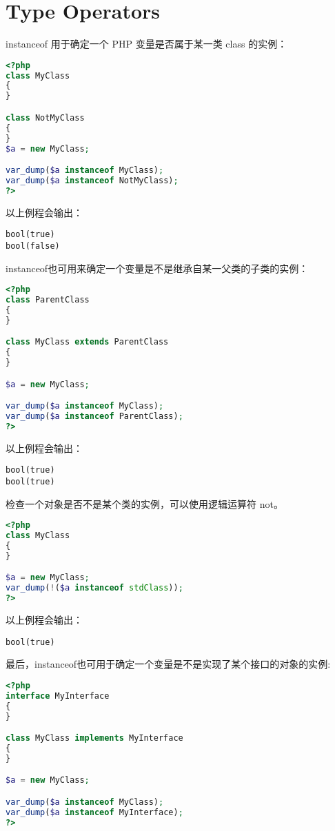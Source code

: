 \section{Type Operators}


instanceof 用于确定一个 PHP 变量是否属于某一类 class 的实例：

\begin{lstlisting}[language=PHP]
<?php
class MyClass
{
}

class NotMyClass
{
}
$a = new MyClass;

var_dump($a instanceof MyClass);
var_dump($a instanceof NotMyClass);
?>
\end{lstlisting}


以上例程会输出：

\begin{verbatim}
bool(true)
bool(false)
\end{verbatim}

instanceof也可用来确定一个变量是不是继承自某一父类的子类的实例：

\begin{lstlisting}[language=PHP]
<?php
class ParentClass
{
}

class MyClass extends ParentClass
{
}

$a = new MyClass;

var_dump($a instanceof MyClass);
var_dump($a instanceof ParentClass);
?>
\end{lstlisting}

以上例程会输出：

\begin{verbatim}
bool(true)
bool(true)
\end{verbatim}

检查一个对象是否不是某个类的实例，可以使用逻辑运算符 not。


\begin{lstlisting}[language=PHP]
<?php
class MyClass
{
}

$a = new MyClass;
var_dump(!($a instanceof stdClass));
?>
\end{lstlisting}

以上例程会输出：

\begin{verbatim}
bool(true)
\end{verbatim}

最后，instanceof也可用于确定一个变量是不是实现了某个接口的对象的实例:

\begin{lstlisting}[language=PHP]
<?php
interface MyInterface
{
}

class MyClass implements MyInterface
{
}

$a = new MyClass;

var_dump($a instanceof MyClass);
var_dump($a instanceof MyInterface);
?>
\end{lstlisting}


